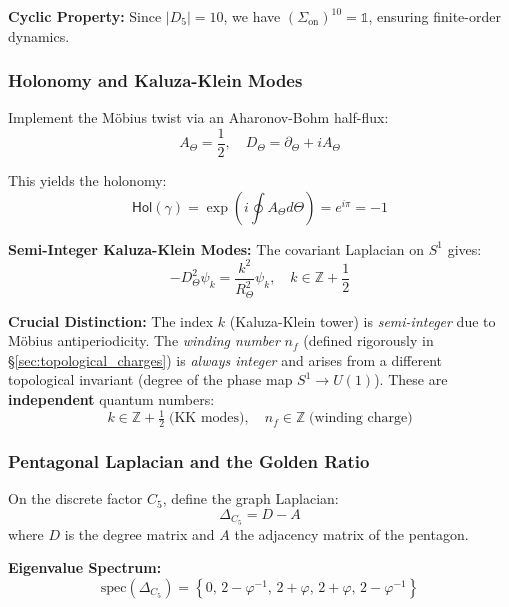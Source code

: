\documentclass[12pt]{article}
\theoremstyle{definition}
\theoremstyle{plain}
\begin{document}
\textbf{Cyclic Property:} Since $|D_5| = 10$, we have $(\Sigma_{\text{on}})^{10} = \mathbb{1}$, ensuring finite-order dynamics.

\subsubsection{Holonomy and Kaluza-Klein Modes}

Implement the M\"obius twist via an Aharonov-Bohm half-flux:
\begin{equation}
A_\Theta = \frac{1}{2}, \quad D_\Theta = \partial_\Theta + iA_\Theta
\end{equation}

This yields the holonomy:
\begin{equation}
\mathsf{Hol}(\gamma) = \exp\left(i \oint A_\Theta d\Theta\right) = e^{i\pi} = -1
\end{equation}

\textbf{Semi-Integer Kaluza-Klein Modes:} The covariant Laplacian on $S^1$ gives:
\begin{equation}
-D_\Theta^2 \psi_k = \frac{k^2}{R_\Theta^2} \psi_k, \quad k \in \mathbb{Z} + \frac{1}{2}
\end{equation}

\textbf{Crucial Distinction:} The index $k$ (Kaluza-Klein tower) is \emph{semi-integer} due to M\"obius antiperiodicity. The \emph{winding number} $n_f$ (defined rigorously in \S\ref{sec:topological_charges}) is \emph{always integer} and arises from a different topological invariant (degree of the phase map $S^1 \to U(1)$). These are \textbf{independent} quantum numbers:
\begin{equation}
\boxed{k \in \mathbb{Z} + \tfrac{1}{2} \;\text{(KK modes)}, \quad n_f \in \mathbb{Z} \;\text{(winding charge)}}
\end{equation}

\subsubsection{Pentagonal Laplacian and the Golden Ratio}

On the discrete factor $C_5$, define the graph Laplacian:
\begin{equation}
\Delta_{C_5} = D - A
\end{equation}
where $D$ is the degree matrix and $A$ the adjacency matrix of the pentagon.

\textbf{Eigenvalue Spectrum:}
\begin{equation}
\boxed{\text{spec}(\Delta_{C_5}) = \left\{0,\, 2 - \varphi^{-1},\, 2 + \varphi,\, 2 + \varphi,\, 2 - \varphi^{-1}\right\}}
\end{equation}
\end{document}
